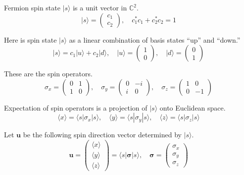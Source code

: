 \documentclass[12pt]{article}
\begin{document}
Fermion spin state $|s\rangle$ is a unit vector in $\mathbb{C}^2$.
\begin{equation*}
|s\rangle=\begin{pmatrix}c_1\\c_2\end{pmatrix},
\quad
c_1^*c_1+c_2^*c_2=1
\end{equation*}

Here is spin state $|s\rangle$ as a linear combination of basis states ``up'' and ``down.''
\begin{equation*}
|s\rangle=c_1|u\rangle+c_2|d\rangle,
\quad
|u\rangle=\begin{pmatrix}1\\0\end{pmatrix},
\quad
|d\rangle=\begin{pmatrix}0\\1\end{pmatrix}
\end{equation*}

These are the spin operators.
\begin{equation*}
\sigma_x=\begin{pmatrix}0&1\\1&0\end{pmatrix},
\quad
\sigma_y=\begin{pmatrix}0&-i\\i&0\end{pmatrix},
\quad
\sigma_z=\begin{pmatrix}1&0\\0&-1\end{pmatrix}
\end{equation*}

Expectation of spin operators is a projection of $|s\rangle$ onto Euclidean space.
\begin{equation*}
\langle x\rangle=\langle s|\sigma_x|s\rangle,
\quad
\langle y\rangle=\langle s|\sigma_y|s\rangle,
\quad
\langle z\rangle=\langle s|\sigma_z|s\rangle
\end{equation*}

Let $\mathbf u$ be the following spin direction vector determined by $|s\rangle$.
\begin{equation*}
\mathbf u=\begin{pmatrix}\langle x\rangle\\\langle y\rangle\\\langle z\rangle\end{pmatrix}
=\langle s|\boldsymbol\sigma|s\rangle,
\quad
\boldsymbol\sigma=\begin{pmatrix}\sigma_x\\\sigma_y\\\sigma_z\end{pmatrix}
\end{equation*}
\end{document}
